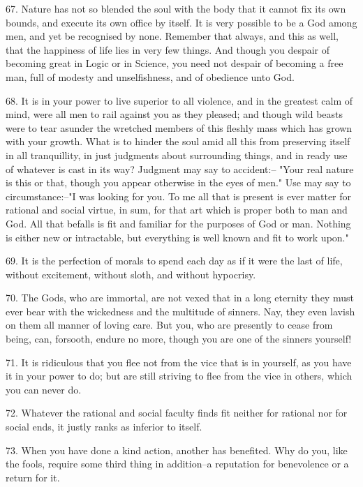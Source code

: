 \documentclass{book}
\begin{document}
67. Nature has not so blended the soul with the body that it cannot
fix its own bounds, and execute its own office by itself. It is very
possible to be a God among men, and yet be recognised by
none. Remember that always, and this as well, that the happiness of
life lies in very few things. And though you despair of becoming great
in Logic or in Science, you need not despair of becoming a free man,
full of modesty and unselfishness, and of obedience unto God.

68. It is in your power to live superior to all violence, and in the
greatest calm of mind, were all men to rail against you as they
pleased; and though wild beasts were to tear asunder the wretched
members of this fleshly mass which has grown with your growth. What is
to hinder the soul amid all this from preserving itself in all
tranquillity, in just judgments about surrounding things, and in ready
use of whatever is cast in its way? Judgment may say to accident:--
"Your real nature is this or that, though you appear otherwise in the
eyes of men." Use may say to circumstance:--"I was looking for
you. To me all that is present is ever matter for rational and social
virtue, in sum, for that art which is proper both to man and God. All
that befalls is fit and familiar for the purposes of God or
man. Nothing is either new or intractable, but everything is well
known and fit to work upon."

69. It is the perfection of morals to spend each day as if it were the
last of life, without excitement, without sloth, and without
hypocrisy.

70. The Gods, who are immortal, are not vexed that in a long eternity
they must ever bear with the wickedness and the multitude of
sinners. Nay, they even lavish on them all manner of loving care. But
you, who are presently to cease from being, can, forsooth, endure no
more, though you are one of the sinners yourself!

71. It is ridiculous that you flee not from the vice that is in
yourself, as you have it in your power to do; but are still striving
to flee from the vice in others, which you can never do.

72. Whatever the rational and social faculty finds fit neither for
rational nor for social ends, it justly ranks as inferior to itself.

73. When you have done a kind action, another has benefited. Why do
you, like the fools, require some third thing in addition--a
reputation for benevolence or a return for it.
\end{document}
